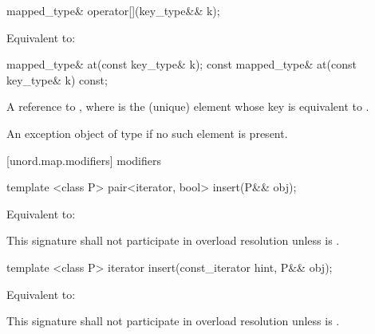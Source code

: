 %
%
\begin{itemdecl}
mapped_type& operator[](key_type&& k);
\end{itemdecl}

\begin{itemdescr}
\pnum
\effects Equivalent to: 
\end{itemdescr}

%
%
\begin{itemdecl}
mapped_type& at(const key_type& k);
const mapped_type& at(const key_type& k) const;
\end{itemdecl}

\begin{itemdescr}
\pnum
\returns A reference to , where  is the (unique) element whose key is equivalent to .

\pnum
\throws An exception object of type  if no such element is present.
\end{itemdescr}

[unord.map.modifiers]{ modifiers}

%
\begin{itemdecl}
template <class P>
  pair<iterator, bool> insert(P&& obj);
\end{itemdecl}

\begin{itemdescr}
\pnum
\effects Equivalent to: 

\pnum
\remarks This signature shall not participate in overload resolution
unless  is .
\end{itemdescr}

%
\begin{itemdecl}
template <class P>
  iterator insert(const_iterator hint, P&& obj);
\end{itemdecl}

\begin{itemdescr}
\pnum
\effects Equivalent to:

\pnum
\remarks This signature shall not participate in overload resolution
unless  is .
\end{itemdescr}

